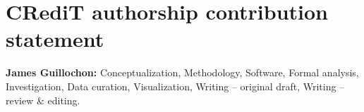 \documentclass[final,5p]{elsarticle}
\begin{document}
\section*{CRediT authorship contribution statement}
\textbf{James Guillochon:} Conceptualization, Methodology, Software, Formal analysis, Investigation, Data curation, Visualization, Writing -- original draft, Writing -- review \& editing.



\end{document}
